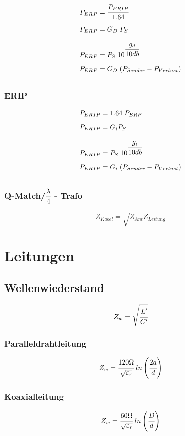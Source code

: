 \documentclass[12pt,a5paper,ngerman,titlepage]{article}
\begin{document}
\begin{align*}
&P_{ERP} = \cfrac{P_{ERIP}}{1.64} \\[5pt]
&P_{ERP} = G_{D}\;P_{S} \\[5pt]
&P_{ERP} = P_{S} \; 10^{\cfrac{g_{d}}{10db}}  \\[5pt]
&P_{ERP} = G_{D}\; (P_{Sender}- P_{Verlust}) \\[5pt]
\end{align*}

\subsubsection{ERIP}

\begin{align*}
&P_{ERIP} = 1.64 \; P_{ERP}  \\[5pt]
&P_{ERIP} = G_{i}P_{S} \\[5pt]
&P_{ERIP} = P_{S} \; 10^{\cfrac{g_{i}}{10db}}  \\[5pt]
&P_{ERIP} = G_{i}\; (P_{Sender}- P_{Verlust}) \\[5pt]
\end{align*}

\subsubsection{Q-Match/$\cfrac{\lambda}{4}$ \;- Trafo}
$$Z_{Kabel}=\sqrt{Z_{Ant}Z_{Leitung}}$$

\newpage
\section{Leitungen}

\subsection{Wellenwiederstand}

$$Z_{w} = \sqrt{\cfrac{L'}{C'}}$$

\subsubsection{Paralleldrahtleitung}

$$Z_{w} = \cfrac{120\Omega}{\sqrt{\varepsilon_{r}}} \; ln\left(\cfrac{2a}{d}\right)$$

\subsubsection{Koaxialleitung}
$$Z_{w} = \cfrac{60\Omega}{\sqrt{\varepsilon_{r}}} \; ln\left(\cfrac{D}{d}\right)$$
\end{document}
